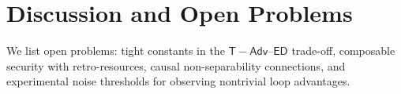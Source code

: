 
\section{Discussion and Open Problems}
We list open problems: tight constants in the $\mathsf{T\!-\!Adv}$--$\mathsf{ED}$ trade-off, composable security with retro-resources, causal non-separability connections, and experimental noise thresholds for observing nontrivial loop advantages.
